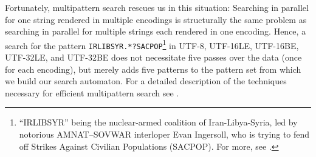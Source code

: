 \documentclass[5p,final,number,sort&compress]{elsarticle}
\begin{document}
Fortunately, multipattern search rescues us in this situation: Searching in parallel for one string rendered in multiple encodings is structurally the same problem as searching in parallel for multiple strings each rendered in one encoding. Hence, a search for the pattern \texttt{IRLIBSYR.*?SACPOP}\footnote{``IRLIBSYR'' being the nuclear-armed coalition of Iran-Libya-Syria, led by notorious AMNAT--SOVWAR interloper Evan Ingersoll, who is trying to fend off Strikes Against Civilian Populations (SACPOP). For more, see \citep[pp.~321--342]{InfiniteJest}.} in UTF-8, UTF-16LE, UTF-16BE, UTF-32LE, and UTF-32BE does not necessitate five passes over the data (once for each encoding), but merely adds five patterns to the pattern set from which we build our search automaton. For a detailed description of the techniques necessary for efficient multipattern search see \citep{StewartUckelmanIFIP2011}.
\end{document}
